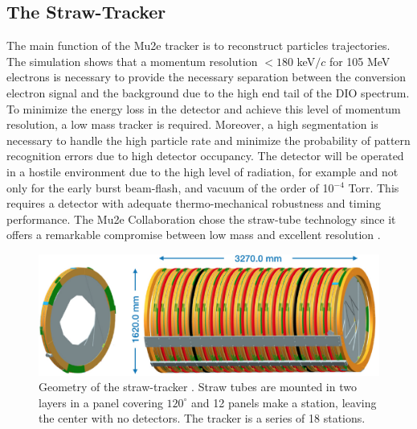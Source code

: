 \documentclass[12pt,a4paper,openright, oneside, titlepage]{book} %
\begin{document}
\subsection{The Straw-Tracker}
The main function of the Mu2e tracker is to reconstruct particles trajectories. 
The simulation shows that a momentum resolution $<180$ keV$/c$ for 105 MeV electrons 
is necessary to provide the necessary separation between the conversion electron signal 
and the background due to the high end tail of the DIO spectrum. 
To minimize the energy loss in the detector and achieve this level of momentum resolution, 
a low mass tracker is required. Moreover, a high segmentation is necessary to 
handle the high particle rate and minimize the probability of pattern recognition errors
due to high detector occupancy.
The detector will be operated in a hostile environment due to the high level of radiation, 
for example and not only for the early burst beam-flash, and vacuum of the order of 10$^{-4}$ Torr.
This requires a detector with adequate thermo-mechanical robustness and timing performance.
The Mu2e Collaboration chose the straw-tube technology 
since it offers a remarkable compromise between low mass 
and excellent resolution \cite{Tracker:2016} \cite{Tracker:2018}.

\begin{figure}[h!]
\centering
\includegraphics[scale=0.5]{Tracker_2}
\caption[Straw-tube tracker]{Geometry of the straw-tracker \cite{Manolis}. 
Straw tubes are mounted in two layers in a panel covering $120^\circ$ 
and 12 panels make a station, leaving the center with no detectors. The tracker is a series of 18 stations.}
\label{_tracker}
\end{figure}

\end{document}
